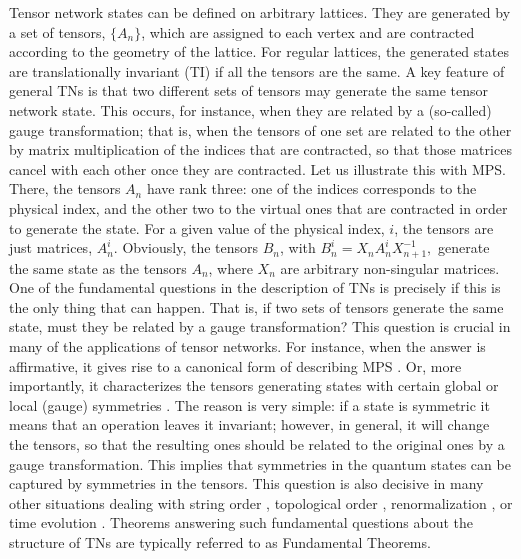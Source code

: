 \documentclass[preprint, superscriptaddress,a4paper,longbibliography]{revtex4-1}
\theoremstyle{definition}
\begin{document}
Tensor network states can be defined on arbitrary lattices. They are generated by a
set of tensors, $\{A_n\}$, which are assigned to each vertex and are contracted according to the geometry of the lattice. For regular lattices, the generated states are translationally invariant (TI) if all the tensors are the same. A key feature of general TNs is that two different sets of tensors may generate the same tensor network state. This occurs,
for instance, when they are related by a (so-called) gauge transformation; that is, when the tensors of one set are related to the other by matrix multiplication of the indices that are contracted, so that those matrices
cancel with each other once they are contracted. Let us illustrate this with MPS. There, the tensors $A_n$ have rank three: one of the indices corresponds to the physical index, and the other two to the virtual ones that
are contracted in order to generate the state. For a given value of the physical index, $i$, the tensors are just matrices, $A^i_n$. Obviously, the tensors $B_n$, with $B^i_n = X_n A^i_n X_{n+1}^{-1},$ generate the same state
as the tensors $A_n$, where $X_n$ are arbitrary non-singular matrices. One of the fundamental questions in the description of TNs is precisely if this is the only thing that can happen. That is, if two sets of tensors generate the same state, must they be related by a gauge transformation? This question is crucial in many of the applications of tensor networks. For instance, when the answer is affirmative, it gives rise to a canonical form of describing MPS \cite{Fannes1992,Perez-Garcia2007,Vidal2003}. Or, more importantly, it characterizes the tensors
generating states with certain global or local (gauge) symmetries \cite{Sanz2009,Kull2017}. The reason is very simple: if a state is symmetric it means that an operation leaves it invariant; however, in general, it will change the tensors, so that the resulting ones should be related to the original ones by a gauge transformation. This implies that symmetries in the quantum states can be captured by symmetries in the tensors. This question is also decisive in many other situations dealing with string order \cite{Perez-Garcia2008a}, topological order \cite{Sahinoglu2014}, renormalization \cite{Cirac2017}, or time evolution \cite{Cirac2017a}. Theorems answering such fundamental questions about the structure of TNs are typically referred to as Fundamental Theorems.
\end{document}
